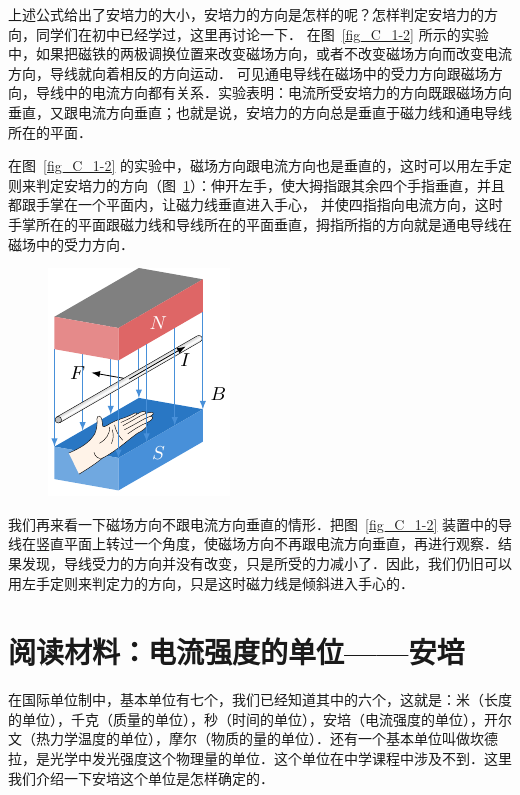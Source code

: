 上述公式给出了安培力的大小，安培力的方向是怎样的呢？怎样判定安培力的方向，同学们在初中已经学过，这里再讨论一下．
在图~\ref{fig_C_1-2} 所示的实验中，如果把磁铁的两极调换位置来改变磁场方向，或者不改变磁场方向而改变电流方向，导线就向着相反的方向运动．
可见通电导线在磁场中的受力方向跟磁场方向，导线中的电流方向都有关系．实验表明：电流所受安培力的方向既跟磁场方向垂直，又跟电流方向垂直；也就是说，安培力的方向总是垂直于磁力线和通电导线所在的平面．

在图~\ref{fig_C_1-2} 的实验中，磁场方向跟电流方向也是垂直的，这时可以用左手定则来判定安培力的方向（图~\ref{fig_C_1-22}）：伸开左手，使大拇指跟其余四个手指垂直，并且都跟手掌在一个平面内，让磁力线垂直进入手心，
并使四指指向电流方向，这时手掌所在的平面跟磁力线和导线所在的平面垂直，拇指所指的方向就是通电导线在磁场中的受力方向．
\begin{figure}[htbp]
    \centering
    \includegraphics{fig/C/1-22.pdf}
    \caption{}\label{fig_C_1-22}
\end{figure}

我们再来看一下磁场方向不跟电流方向垂直的情形．把图~\ref{fig_C_1-2} 装置中的导线在竖直平面上转过一个角度，使磁场方向不再跟电流方向垂直，再进行观察．结果发现，导线受力的方向并没有改变，只是所受的力减小了．因此，我们仍旧可以用左手定则来判定力的方向，只是这时磁力线是倾斜进入手心的．

\section*{阅读材料：电流强度的单位——安培}
在国际单位制中，基本单位有七个，我们已经知道其中的六个，这就是：米（长度的单位），千克（质量的单位），秒（时间的单位），安培（电流强度的单位），开尔文（热力学温度的单位），摩尔（物质的量的单位）．还有一个基本单位叫做坎德拉，是光学中发光强度这个物理量的单位．这个单位在中学课程中涉及不到．这里我们介绍一下安培这个单位是怎样确定的．

